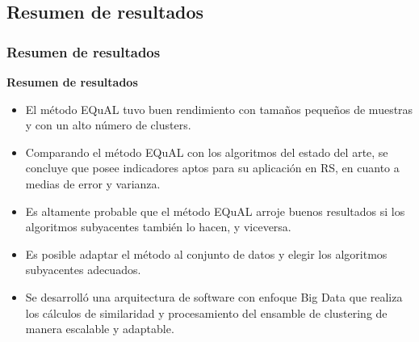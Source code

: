 \begin{frame}
\begin{figure}[h!]
{
		}
		\label{fig:performance1000}
	\end{figure}

\end{frame}

\subsection{Resumen de resultados}
\begin{frame}
	\frametitle{Resumen de resultados}
	\textbf{Resumen de resultados}
	\bigskip
	\begin{itemize}
		\item El método EQuAL tuvo buen rendimiento con tamaños pequeños de muestras y con un alto número de clusters.
		\item Comparando el método EQuAL con los algoritmos del estado del arte, se concluye que posee indicadores aptos para su aplicación en RS, en cuanto a medias de error y varianza.
		\item Es altamente probable que el método EQuAL arroje buenos resultados si los algoritmos subyacentes también lo hacen, y viceversa.
		\item Es posible adaptar el método al conjunto de datos y elegir los algoritmos subyacentes adecuados.
		\item Se desarrolló una arquitectura de software con enfoque Big Data que realiza los cálculos de similaridad y procesamiento del ensamble de clustering de manera escalable y adaptable.
	\end{itemize}
\end{frame}